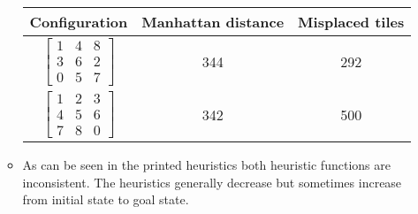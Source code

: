 \documentclass[a4paper, 12pt]{article}
\begin{document}
\begin{enumerate}
\begin{itemize}
                \begin{tabular}{ccc}
                \toprule
                Configuration               & Manhattan distance    & Misplaced tiles   \\
                \toprule
                $\left[\begin{array}{ccc}
                1 & 4 & 8 \\
                3 & 6 & 2 \\
                0 & 5 & 7
                \end{array}\right]$         & 344                   & 292               \\
                $\left[\begin{array}{ccc}
                1 & 2 & 3 \\
                4 & 5 & 6 \\
                7 & 8 & 0
                \end{array}\right]$         & 342                   & 500               \\
                \bottomrule
                \end{tabular}

            \item As can be seen in the printed heuristics both heuristic functions
            are inconsistent. The heuristics generally decrease but sometimes
            increase from initial state to goal state.
        \end{itemize}

    \end{enumerate}
\end{document}
